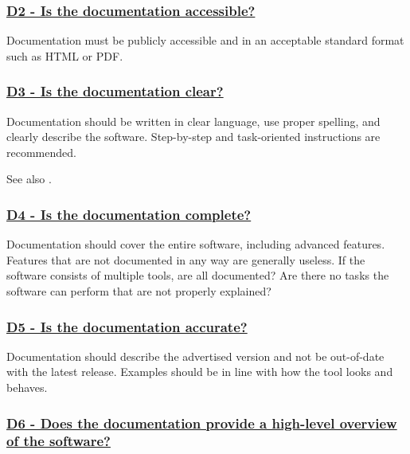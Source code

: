 \documentclass[a4paper,11pt]{article}
\newcommand{\criterion}[2]{\subsubsection*{\underline{#1 - #2}}\label{id:#1}}
\newcommand\CheckTable{%
  \begin{tabular}{ccccc}
    No & Minimal & Adequate & Good & Perfect \\
    0 & 1 & 2 & 3 & 4 \\
    \hline
    $\square$ & $\square$ & $\square$ & $\square$ & $\square$ \\
  \end{tabular}%
}
\newcommand{\refcrit}[1]{%
 \framebox[1.1\width]{\hyperref[id:#1]{#1}}
}
\begin{document}
\newcommand{\dTwoID}{D2}
\newcommand{\dTwoText}{Is the documentation accessible?}
\criterion{\dTwoID}{\dTwoText}

Documentation must be publicly accessible and in an acceptable standard format
such as HTML or PDF.


\newcommand{\dThreeID}{D3}
\newcommand{\dThreeText}{Is the documentation clear?}
\criterion{\dThreeID}{\dThreeText}

Documentation should be written in clear language, use proper spelling, and
clearly describe the software. Step-by-step and task-oriented instructions are
recommended.

See also \refcrit{D7}.


\newcommand{\dFourID}{D4}
\newcommand{\dFourText}{Is the documentation complete?}
\criterion{\dFourID}{\dFourText}

Documentation should cover the entire software, including advanced features.
Features that are not documented in any way are generally useless. If the
software consists of multiple tools, are all documented? Are there no tasks the
software can perform that are not properly explained?

%
%
%


\newcommand{\dFiveID}{D5}
\newcommand{\dFiveText}{Is the documentation accurate?}
\criterion{\dFiveID}{\dFiveText}

Documentation should describe the advertised version and not be out-of-date
with the latest release. Examples should be in line with how the tool looks and
behaves.


\newcommand{\dSixID}{D6}
\newcommand{\dSixText}{Does the documentation provide a high-level overview of the software?}
\criterion{\dSixID}{\dSixText}
\end{document}
